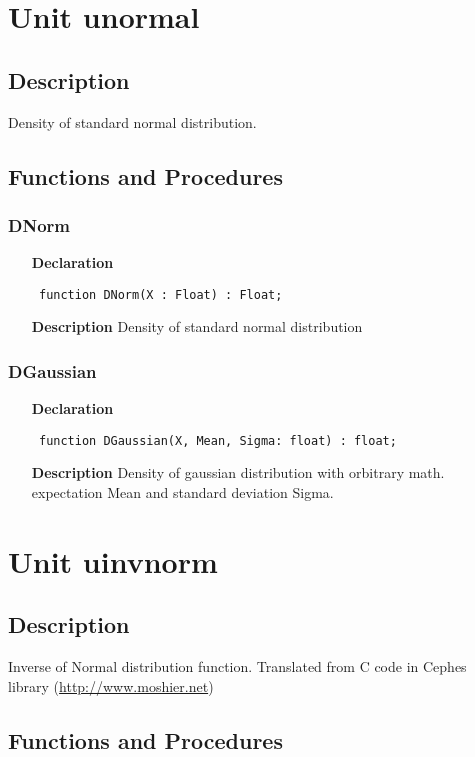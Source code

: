 \documentclass[12pt,a4paper,oneside]{report}
\newcommand{\lmath}[1]{   %
	\marginpar{\vspace{#1} 
		\begin{flushright}
			LMath
	\end{flushright} }
}
\newcommand{\declarationitem}[1]{\textbf{#1}}
\newcommand{\descriptiontitle}[1]{\textbf{#1}}
\newcommand{\code}[1]{\texttt{#1}}
\begin{document}
\section{Unit unormal}
\label{unormal}
\subsection{Description}
Density of standard normal distribution. 
\subsection{Functions and Procedures}
\subsubsection{DNorm}
\label{unormal-DNorm}
\begin{itemize}\item[\declarationitem{Declaration}\hfill]
	\begin{flushleft}
		\code{
			function DNorm(X : Float) : Float;}
	\end{flushleft}
	\item[\descriptiontitle{Description}]
	Density of standard normal distribution
\end{itemize}
\subsubsection{DGaussian}\lmath{-24pt}
\label{unormal-DGaussian}
\begin{itemize}\item[\declarationitem{Declaration}\hfill]
	\begin{flushleft}
		\code{
			function DGaussian(X, Mean, Sigma: float) : float;}
	\end{flushleft}
	\item[\descriptiontitle{Description}]
	Density of gaussian distribution with orbitrary math. expectation Mean and standard deviation Sigma.
\end{itemize}
\section{Unit uinvnorm}
\label{uinvnorm}
\subsection{Description}
Inverse of Normal distribution function. 
Translated from C code in Cephes library (\href{http://www.moshier.net}{http://www.moshier.net}) \subsection{Functions and Procedures}
\end{document}
